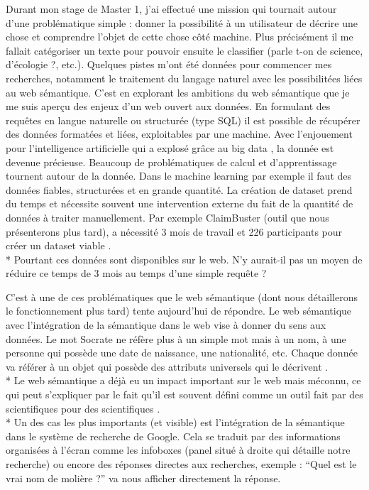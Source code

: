 Durant mon stage de Master 1, j'ai effectué une mission qui tournait autour d'une problématique simple : donner la possibilité à un utilisateur de décrire une chose et comprendre l'objet de cette chose côté machine. Plus précisément il me fallait catégoriser un texte pour pouvoir ensuite le classifier (parle t-on de science, d'écologie ?, etc.). Quelques pistes m'ont été données pour commencer mes recherches, notamment le traitement du langage naturel avec les possibilitées liées au web sémantique. C'est en explorant les ambitions du web sémantique que je me suis aperçu des enjeux d'un web ouvert aux données. En formulant des requêtes en langue naturelle ou structurée (type SQL) il est possible de récupérer des données formatées et liées, exploitables par une machine. Avec l'enjouement pour l'intelligence artificielle qui a explosé grâce au big data \cite{sh}, la donnée est devenue précieuse. Beaucoup de problématiques de calcul et d'apprentissage tournent autour de la donnée. Dans le machine learning par exemple il faut des données fiables, structurées et en grande quantité. La création de dataset prend du temps et nécessite souvent une intervention externe du fait de la quantité de données à traiter manuellement. Par exemple ClaimBuster (outil que nous présenterons plus tard), a nécessité 3 mois de travail et 226 participants pour créer un dataset viable \cite{hassan2015quest}.
\\*
Pourtant ces données sont disponibles sur le web. N'y aurait-il pas un moyen de réduire ce temps de 3 mois au temps d'une simple requête ?

C'est à une de ces problématiques que le web sémantique (dont nous détaillerons le fonctionnement plus tard) tente aujourd'hui de répondre. Le web sémantique avec l'intégration de la sémantique dans le web vise à donner du sens aux données. Le mot Socrate ne réfère plus à un simple mot mais à un nom, à une personne qui possède une date de naissance, une nationalité, etc. Chaque donnée va référer à un objet qui possède des attributs universels qui le décrivent \cite{schemaPerson}.
\\*
Le web sémantique a déjà eu un impact important sur le web mais méconnu, ce qui peut s'expliquer par le fait qu'il est souvent défini comme un outil fait par des scientifiques pour des scientifiques \cite{semantic_web_has_failed}.
\\*
Un des cas les plus importants (et visible) est l'intégration de la sémantique dans le système de recherche de Google. Cela se traduit par des informations organisées à l'écran comme les infoboxes (panel situé à droite qui détaille notre recherche) ou encore des réponses directes aux recherches, exemple : \enquote{Quel est le vrai nom de molière ?} va nous afficher directement la réponse.

